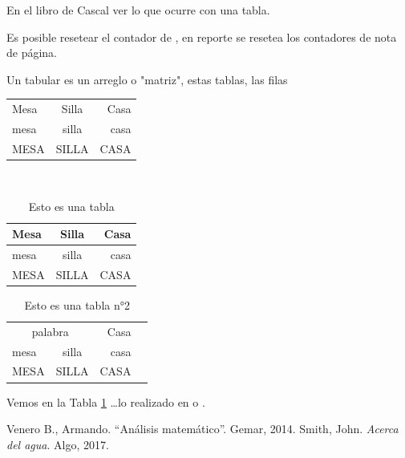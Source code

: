 \documentclass{article}
\begin{document}

En el libro de Cascal ver lo que ocurre con una tabla.

Es posible resetear el contador de , en reporte se resetea los contadores de nota de página.

Un tabular es un arreglo o "matriz", estas tablas, las filas\\[2cm]

\renewcommand{\spanishtablename}{Tablita}

\begin{tabular}{lcr}
	Mesa & Silla & Casa \\
	mesa & silla & casa \\
	MESA & SILLA & CASA
\end{tabular}

\ \\[2cm]
\begin{table}[H] %
\centering
\caption{Esto es una tabla}%
\begin{tabular}{|l|c|r|}
	\hline
	Mesa & Silla & Casa \\
	\hline
	mesa & silla & casa \\
	\hline
	MESA & SILLA & CASA \\
	\hline
\end{tabular}
\end{table}

\begin{table}[H] %
	\centering
	\caption{Esto es una tabla n°2}\label{tab:2}%
	\begin{tabular}{|l|c|r|p{3cm}||}
		\hline
		\multicolumn{2}{|c|}{palabra} & Casa \\
		\cline{2-3}
		mesa & silla & casa \\
		\hline\hline
		MESA & SILLA & CASA\newline \\
		\hline
	\end{tabular}
\end{table}
Vemos en la Tabla \ref{tab:2} \ldots lo realizado en \cite{V14} o \cite{smi17}.
\begin{thebibliography}{99}
	 Venero B., Armando. ``Análisis matemático''. Gemar, 2014.
	 Smith, John. \emph{Acerca del agua}. Algo, 2017.
\end{thebibliography}
\newpage
\end{document}
